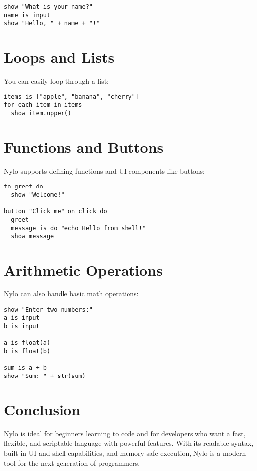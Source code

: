 \documentclass[12pt]{article}
\begin{document}
\begin{lstlisting}[style=nylo, caption=User Input Example]
show "What is your name?"
name is input
show "Hello, " + name + "!"
\end{lstlisting}

\section*{Loops and Lists}
You can easily loop through a list:

\begin{lstlisting}[style=nylo, caption=List and Loop]
items is ["apple", "banana", "cherry"]
for each item in items
  show item.upper()
\end{lstlisting}

\section*{Functions and Buttons}
Nylo supports defining functions and UI components like buttons:

\begin{lstlisting}[style=nylo, caption=Function and Button Example]
to greet do
  show "Welcome!"

button "Click me" on click do
  greet
  message is do "echo Hello from shell!"
  show message
\end{lstlisting}

\section*{Arithmetic Operations}
Nylo can also handle basic math operations:

\begin{lstlisting}[style=nylo, caption=Arithmetic in Nylo]
show "Enter two numbers:"
a is input
b is input

a is float(a)
b is float(b)

sum is a + b
show "Sum: " + str(sum)
\end{lstlisting}

\section*{Conclusion}
Nylo is ideal for beginners learning to code and for developers who want a fast, flexible, and scriptable language with powerful features. With its readable syntax, built-in UI and shell capabilities, and memory-safe execution, Nylo is a modern tool for the next generation of programmers.
\end{document}

